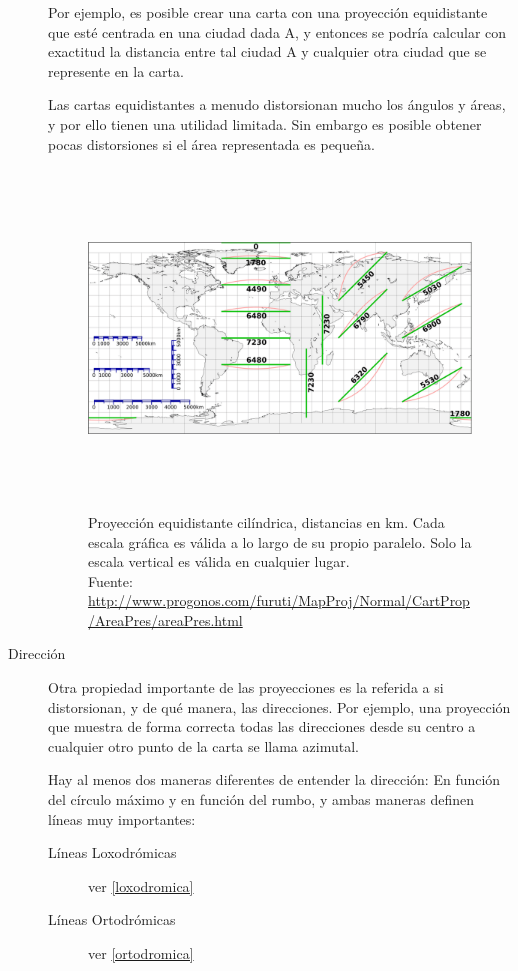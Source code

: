 \begin{description}
Por ejemplo, es posible crear una carta con una proyección equidistante que esté centrada en una ciudad dada A, y entonces se podría calcular con exactitud la distancia entre tal ciudad A y cualquier otra ciudad que se represente en la carta.

Las cartas equidistantes a menudo distorsionan mucho los ángulos y áreas, y por ello tienen una utilidad limitada. Sin embargo es posible obtener pocas distorsiones si el área representada es pequeña. 

    \begin{figure}[!h]
      \centering
  \includegraphics[height=9cm]{06.radionavegacion/Imagenes/proyeccion-equidistante.png}
      \caption{Proyecci\'on equidistante cil\'indrica, distancias en km. Cada escala gr\'afica es v\'alida a lo largo de su propio paralelo. Solo la escala vertical es v\'alida en cualquier lugar.\\{\footnotesize Fuente: \url{http://www.progonos.com/furuti/MapProj/Normal/CartProp/AreaPres/areaPres.html}}}
      \label{fig:proyeccion.equidistante}
    \end{figure}


\item[Dirección]  Otra propiedad importante de las proyecciones es la referida a si distorsionan, y de qué manera, las direcciones. Por ejemplo, una proyección que muestra de forma correcta todas las direcciones desde su centro a cualquier otro punto de la carta se llama azimutal.

Hay al menos dos maneras diferentes de entender la dirección: En función del círculo máximo y en función del rumbo, y ambas maneras definen líneas muy importantes: 

\begin{description}
	\item[Líneas Loxodrómicas] ver \ref{loxodromica} %
	\item[Líneas Ortodrómicas] ver \ref{ortodromica} %
\end{description}


\end{description}
